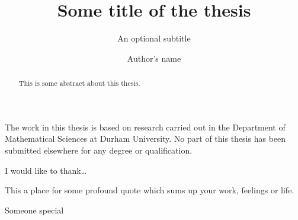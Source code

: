 \documentclass[twoside,openright,frontopenright]{dmathesis}
\begin{document}
\title{Some title of the thesis}
\subtitle{An optional subtitle}
\author{Author's name}
\maketitlepage*

\begin{abstract}
%
	This is some abstract about this thesis.
%
\end{abstract}

\tableofcontents*
\listoffigures
\listoftables

\begin{declaration*}
%
	The work in this thesis is based on research carried out in the Department of
	Mathematical Sciences at Durham University. No part of this thesis has been
	submitted elsewhere for any degree or qualification.
%
\end{declaration*}

\begin{acknowledgements*}
%
	I would like to thank\ldots
%
\end{acknowledgements*}

\begin{epigraph*}
%
	This a place for some profound quote which sums up your work, feelings or
	life.
%
\end{epigraph*}

\begin{dedication*}
%
	Someone special
%
\end{dedication*}

\disableprotrusion
\enableprotrusion

\cleardoublepage

%
%
%
%
%

\appendix
%
%

\nocite{*}
\printbibliography[heading=bibintoc]
\end{document}
